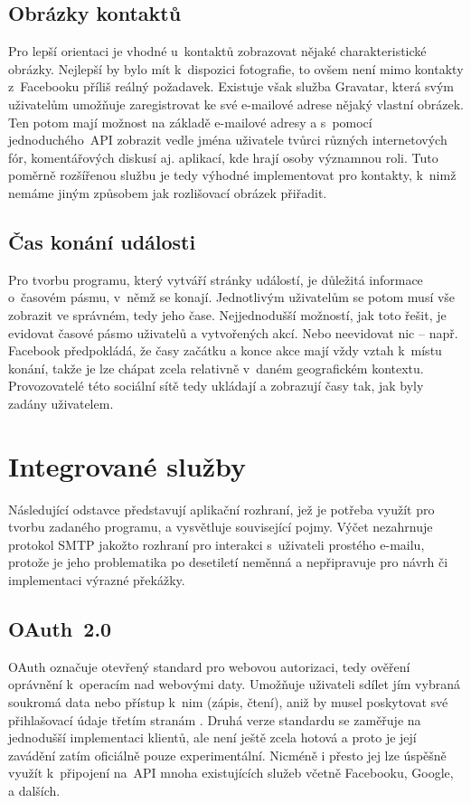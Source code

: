 \documentclass[12pt,oneside,final]{fithesis2}
\begin{document}
\subsection{Obrázky kontaktů}
Pro lepší orientaci je vhodné u~kontaktů zobrazovat nějaké charakteristické obrázky. Nejlepší by bylo mít k~dispozici fotografie, to ovšem není mimo kontakty z~Facebooku příliš reálný požadavek. Existuje však služba Gravatar, která svým uživatelům umožňuje zaregistrovat ke své e-mailové adrese nějaký vlastní obrázek. Ten potom mají možnost na základě e-mailové adresy a s~pomocí jednoduchého~API zobrazit vedle jména uživatele tvůrci různých internetových fór, komentářových diskusí aj. aplikací, kde hrají osoby významnou roli. Tuto poměrně rozšířenou službu je tedy výhodné implementovat pro kontakty, k~nimž nemáme jiným způsobem jak rozlišovací obrázek přiřadit.

\subsection{Čas konání události}\label{timezone}
Pro tvorbu programu, který vytváří stránky událostí, je důležitá informace o~časovém pásmu, v~němž se konají. Jednotlivým uživatelům se potom musí vše zobrazit ve správném, tedy jeho čase. Nejjednodušší možností, jak toto řešit, je evidovat časové pásmo uživatelů a vytvořených akcí. Nebo neevidovat nic -- např. Facebook předpokládá, že časy začátku a konce akce mají vždy vztah k~místu konání, takže je lze chápat zcela relativně v~daném geografickém kontextu. Provozovatelé této sociální sítě tedy ukládají a zobrazují časy tak, jak byly zadány uživatelem.


\section{Integrované služby}
Následující odstavce představují aplikační rozhraní, jež je potřeba využít pro tvor\-bu zadaného programu, a vysvětluje související pojmy. Výčet nezahrnuje pro\-to\-kol SMTP jakožto rozhraní pro interakci s~uživateli prostého e-mailu, protože je jeho problematika po desetiletí neměnná a nepřipravuje pro návrh či implementaci výrazné překážky.

\subsection{OAuth~2.0}
OAuth označuje otevřený standard pro webovou autorizaci, tedy ověření oprávnění k~operacím nad webovými daty. Umožňuje uživateli sdílet jím vybraná soukromá data nebo přístup k~nim (zápis, čtení), aniž by musel poskytovat své přihlašovací údaje třetím stranám \cite{maly2008oauth}. Druhá verze standardu se zaměřuje na jednodušší implementaci klientů, ale není ještě zcela hotová a proto je její zavádění zatím oficiálně pouze experimentální. Nicméně i přesto jej lze úspěšně využít k~připojení na~API mnoha existujících služeb včetně Facebooku, Google, a dalších.
\end{document}
